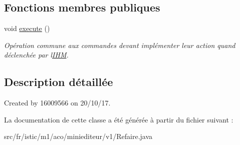 \subsection*{Fonctions membres publiques}
\begin{DoxyCompactItemize}
\item 
\mbox{\label{classfr_1_1istic_1_1m1_1_1aco_1_1miniediteur_1_1v1_1_1Refaire_accb0d09315abed5674ea85477a530819}} 
void \hyperlink{classfr_1_1istic_1_1m1_1_1aco_1_1miniediteur_1_1v1_1_1Refaire_accb0d09315abed5674ea85477a530819}{execute} ()
\begin{DoxyCompactList}\small\item\em Opération commune aux commandes devant implémenter leur action quand déclenchée par l\textquotesingle{}\hyperlink{interfacefr_1_1istic_1_1m1_1_1aco_1_1miniediteur_1_1v1_1_1IHM}{I\+HM}. \end{DoxyCompactList}\end{DoxyCompactItemize}


\subsection{Description détaillée}
Created by 16009566 on 20/10/17. 

La documentation de cette classe a été générée à partir du fichier suivant \+:\begin{DoxyCompactItemize}
\item 
src/fr/istic/m1/aco/miniediteur/v1/Refaire.\+java\end{DoxyCompactItemize}
